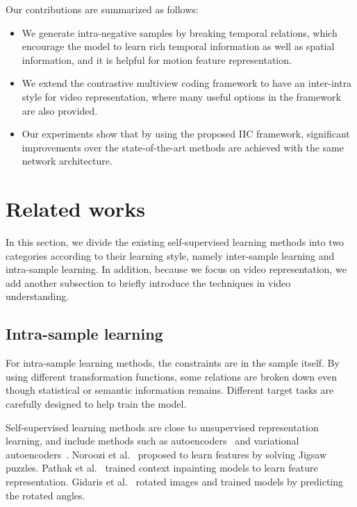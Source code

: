 \documentclass[sigconf]{acmart}
\begin{document}
Our contributions are summarized as follows:
\begin{itemize}
\item We generate intra-negative samples by breaking temporal relations, which encourage the model to learn rich temporal information as well as spatial information, and it is helpful for motion feature representation.
\item We extend the contrastive multiview coding framework to have an inter-intra style for video representation, where many useful options in the framework are also provided.
\item Our experiments show that by using the proposed IIC framework, significant improvements over the state-of-the-art methods are achieved with the same network architecture.
\end{itemize}




\section{Related works}
In this section, we divide the existing self-supervised learning methods into two categories according to their learning style, namely inter-sample learning and intra-sample learning. In addition, because we focus on video representation, we add another subsection to briefly introduce the techniques in video understanding.

\subsection{Intra-sample learning}
For intra-sample learning methods, the constraints are in the sample itself. By using different transformation functions, some relations are broken down even though statistical or semantic information remains. Different target tasks are carefully designed to help train the model.

Self-supervised learning methods are close to unsupervised representation learning, and include methods such as autoencoders~\cite{hinton2006reducing} and variational autoencoders~\cite{kingma2013auto}.
Noroozi et al.~\cite{noroozi2016unsupervised} proposed to learn features by solving Jigsaw puzzles. Pathak et al.~\cite{pathak2016context} trained context inpainting models to learn feature representation. Gidaris et al.~\cite{gidaris2018unsupervised} rotated images and trained models by predicting the rotated angles.
\end{document}
